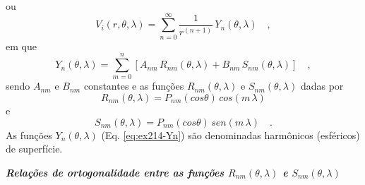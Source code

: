 \documentclass[10pt,a4paper,fleqn]{article}
\begin{document}
ou
\begin{equation}
V_{i}(r,\theta,\lambda) = \sum_{n=0}^{\infty} \frac{1}{r^{(n+1)}} \,
Y_{n}(\theta, \lambda) \quad ,
\label{eq:ex214-vi}
\end{equation}
em que 
\begin{equation}
Y_{n}(\theta, \lambda) = \sum_{m=0}^{n} 
\left[ 
A_{nm} \, R_{nm}(\theta, \lambda) +
B_{nm} \, S_{nm}(\theta, \lambda)
\right] \quad ,
\label{eq:ex214-Yn}
\end{equation}
sendo $A_{nm}$ e $B_{nm}$ constantes e as funç\~{o}es $R_{nm}(\theta, \lambda)$ e $S_{nm}(\theta, \lambda)$ dadas por
\begin{equation}
R_{nm}(\theta, \lambda) = P_{nm}(cos\theta) \, cos(m \, \lambda)
\label{eq:ex214-rnm}
\end{equation}
e
\begin{equation}
S_{nm}(\theta, \lambda) = P_{nm}(cos\theta) \, sen(m \, \lambda) \quad .
\label{eq:ex214-snm}
\end{equation}
As funç\~{o}es $Y_{n}(\theta, \lambda)$ (Eq. \ref{eq:ex214-Yn}) s\~{a}o denominadas harm\^{o}nicos (esf\'{e}ricos) de superf\'{i}cie.

\bigskip
\bigskip

\begin{flushleft}
\emph{\textbf{Relaç\~{o}es de ortogonalidade entre as funç\~{o}es $R_{nm}(\theta, \lambda)$ e $S_{nm}(\theta, \lambda)$}}
\end{flushleft}

\bigskip
\bigskip
\end{document}
